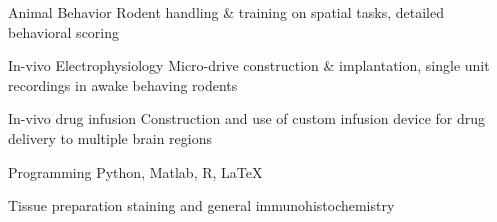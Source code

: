 

\begin{cvskills}

  \cvskill
    {Animal Behavior} %
    {Rodent handling \& training on spatial tasks, detailed behavioral scoring} %

  \cvskill
    {In-vivo Electrophysiology} %
    {Micro-drive construction \& implantation, single unit recordings in awake behaving rodents} %

  \cvskill
    {In-vivo drug infusion} %
    {Construction and use of custom infusion device for drug delivery to multiple brain regions} %

  \cvskill
    {Programming} %
    {Python, Matlab, R, \LaTeX} %

  \cvskill
    {Tissue preparation} %
    {staining and general immunohistochemistry} %

\end{cvskills}





